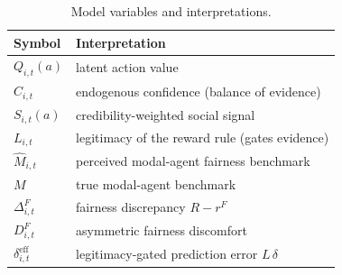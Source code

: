 \begin{table}[t]\centering\small
\caption{Model variables and interpretations.}
\label{tab:variables}
\begin{tabular}{ll}\toprule Symbol & Interpretation \\ \midrule
$Q_{i,t}(a)$ & latent action value \\
$C_{i,t}$ & endogenous confidence (balance of evidence) \\
$S_{i,t}(a)$ & credibility-weighted social signal \\
$L_{i,t}$ & legitimacy of the reward rule (gates evidence) \\
$\hat M_{i,t}$ & perceived modal-agent fairness benchmark \\
$M$ & true modal-agent benchmark \\
$\Delta^F_{i,t}$ & fairness discrepancy $R-r^F$ \\
$D^F_{i,t}$ & asymmetric fairness discomfort \\
$\delta^{\mathrm{eff}}_{i,t}$ & legitimacy-gated prediction error $L\,\delta$ \\
\bottomrule\end{tabular}
\end{table}
